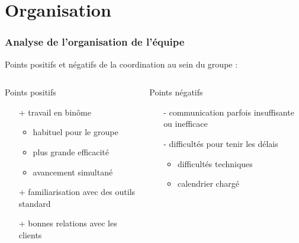\section{Organisation}

\begin{frame}
\tableofcontents[currentsection]
\end{frame}
\begin{frame}

\frametitle{Analyse de l'organisation de l'équipe}
Points positifs et négatifs de la coordination au sein du groupe :

\bigskip
  \begin{columns}[t]
  \begin{column}{5cm}
  \begin{exampleblock}{Points positifs}
\begin{itemize}
    \item[+] travail en binôme
      \begin{itemize}
      \item habituel pour le groupe
      \item plus grande efficacité
      \item avancement simultané
      \end{itemize}
    \item[+] familiarisation avec des outils standard
    \item[+] bonnes relations avec les clients
  \end{itemize}
  \end{exampleblock} 
  \end{column}
  
  \begin{column}{5cm}
  \begin{alertblock}{Points négatifs}
\begin{itemize}
    \item[-] communication parfois insuffisante ou inefficace
    \item[-] difficultés pour tenir les délais
      \begin{itemize}
      \item difficultés techniques
      \item calendrier chargé
      \end{itemize}
      
    \end{itemize}
  \end{alertblock}   
  \end{column}
  \end{columns}  

\end{frame}